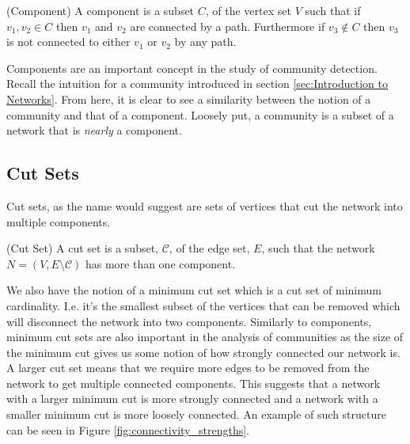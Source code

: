 \begin{definition}{(Component)}
    A component is a subset $C$, of the vertex set $V$ such that if $v_1, v_2 \in C$ then $v_1$ and $v_2$ are connected by a path. Furthermore if $v_3 \not\in C$ then $v_3$ is not connected to either $v_1$ or $v_2$ by any path.
\end{definition}

Components are an important concept in the study of community detection. Recall the intuition for a community introduced in section \ref{sec:Introduction to Networks}. From here, it is clear to see a similarity between the notion of a community and that of a component. Loosely put, a community is a subset of a network that is \emph{nearly} a component.


\subsection{Cut Sets}
Cut sets, as the name would suggest are sets of vertices that cut the network into multiple components. 

\begin{definition}{(Cut Set)}
    A cut set is a subset, $\mathcal{C}$, of the edge set, $E$, such that the network $N = (V, E\setminus\mathcal{C})$ has more than one component.
\end{definition}

We also have the notion of a minimum cut set which is a cut set of minimum cardinality. I.e. it's the smallest subset of the vertices that can be removed which will disconnect the network into two components. Similarly to components, minimum cut sets are also important in the analysis of communities as the size of the minimum cut gives us some notion of how strongly connected our network is. A larger cut set means that we require more edges to be removed from the network to get multiple connected components. This suggests that a network with a larger minimum cut is more strongly connected and a network with a smaller minimum cut is more loosely connected. An example of such structure can be seen in Figure \ref{fig:connectivity_strengths}.

